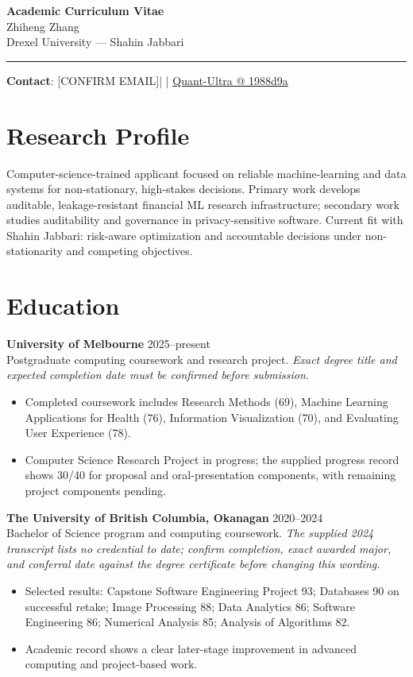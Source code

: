 \documentclass[11pt]{article}
\makeatletter
\newcommand{\ApplicantName}{Zhiheng Zhang}
\newcommand{\ApplicantEmail}{[CONFIRM EMAIL]}
\newcommand{\ApplicantPhone}{[CONFIRM PHONE]}
\newcommand{\ApplicantGitHub}{\href{https://github.com/zhiheng-zhang-Mera/Quant-Ultra/tree/1988d9a8530da91a8158de864d098ea869098923}{Quant-Ultra @ 1988d9a}}
\makeatother
\begin{document}
\begin{center}
{\LARGE\bfseries Academic Curriculum Vitae}\\[0.25em]
{\large \ApplicantName}\\
Drexel University --- Shahin Jabbari
\end{center}
\vspace{0.35em}\hrule\vspace{0.65em}

\textbf{Contact}: \ApplicantEmail\quad | \quad \ApplicantPhone\quad | \quad \ApplicantGitHub

\section*{Research Profile}
Computer-science-trained applicant focused on reliable machine-learning and data systems for non-stationary, high-stakes decisions. Primary work develops auditable, leakage-resistant financial ML research infrastructure; secondary work studies auditability and governance in privacy-sensitive software. Current fit with Shahin Jabbari: risk-aware optimization and accountable decisions under non-stationarity and competing objectives.

\section*{Education}
\textbf{University of Melbourne} \hfill 2025--present\\
Postgraduate computing coursework and research project. \textit{Exact degree title and expected completion date must be confirmed before submission.}
\begin{itemize}
\item Completed coursework includes Research Methods (69), Machine Learning Applications for Health (76), Information Visualization (70), and Evaluating User Experience (78).
\item Computer Science Research Project in progress; the supplied progress record shows 30/40 for proposal and oral-presentation components, with remaining project components pending.
\end{itemize}

\textbf{The University of British Columbia, Okanagan} \hfill 2020--2024\\
Bachelor of Science program and computing coursework. \textit{The supplied 2024 transcript lists no credential to date; confirm completion, exact awarded major, and conferral date against the degree certificate before changing this wording.}
\begin{itemize}
\item Selected results: Capstone Software Engineering Project 93; Databases 90 on successful retake; Image Processing 88; Data Analytics 86; Software Engineering 86; Numerical Analysis 85; Analysis of Algorithms 82.
\item Academic record shows a clear later-stage improvement in advanced computing and project-based work.
\end{itemize}
\end{document}
